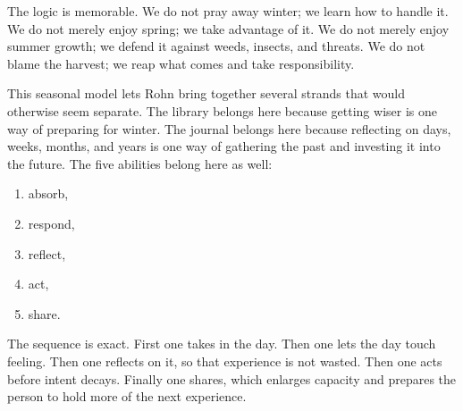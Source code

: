 \begin{figure}
\begin{center}
\end{center}
\end{figure}

The logic is memorable. We do not pray away winter; we learn how to handle it. We do not merely enjoy spring; we take advantage of it. We do not merely enjoy summer growth; we defend it against weeds, insects, and threats. We do not blame the harvest; we reap what comes and take responsibility.

This seasonal model lets Rohn bring together several strands that would otherwise seem separate. The library belongs here because getting wiser is one way of preparing for winter. The journal belongs here because reflecting on days, weeks, months, and years is one way of gathering the past and investing it into the future. The five abilities belong here as well:
\begin{enumerate}
\item absorb,
\item respond,
\item reflect,
\item act,
\item share.
\end{enumerate}
The sequence is exact. First one takes in the day. Then one lets the day touch feeling. Then one reflects on it, so that experience is not wasted. Then one acts before intent decays. Finally one shares, which enlarges capacity and prepares the person to hold more of the next experience.

